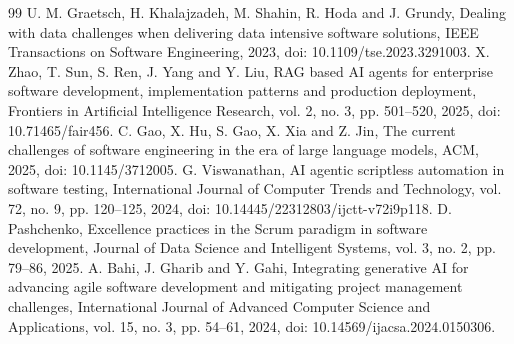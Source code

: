 \documentclass[conference]{IEEEtran}
\begin{document}
\begin{thebibliography}{99}
 U. M. Graetsch, H. Khalajzadeh, M. Shahin, R. Hoda and J. Grundy, Dealing with data challenges when delivering data intensive software solutions, IEEE Transactions on Software Engineering, 2023, doi: 10.1109/tse.2023.3291003.
 X. Zhao, T. Sun, S. Ren, J. Yang and Y. Liu, RAG based AI agents for enterprise software development, implementation patterns and production deployment, Frontiers in Artificial Intelligence Research, vol. 2, no. 3, pp. 501--520, 2025, doi: 10.71465/fair456.
 C. Gao, X. Hu, S. Gao, X. Xia and Z. Jin, The current challenges of software engineering in the era of large language models, ACM, 2025, doi: 10.1145/3712005.
 G. Viswanathan, AI agentic scriptless automation in software testing, International Journal of Computer Trends and Technology, vol. 72, no. 9, pp. 120--125, 2024, doi: 10.14445/22312803/ijctt-v72i9p118.
 D. Pashchenko, Excellence practices in the Scrum paradigm in software development, Journal of Data Science and Intelligent Systems, vol. 3, no. 2, pp. 79--86, 2025.
 A. Bahi, J. Gharib and Y. Gahi, Integrating generative AI for advancing agile software development and mitigating project management challenges, International Journal of Advanced Computer Science and Applications, vol. 15, no. 3, pp. 54--61, 2024, doi: 10.14569/ijacsa.2024.0150306.
\end{thebibliography}
\end{document}
